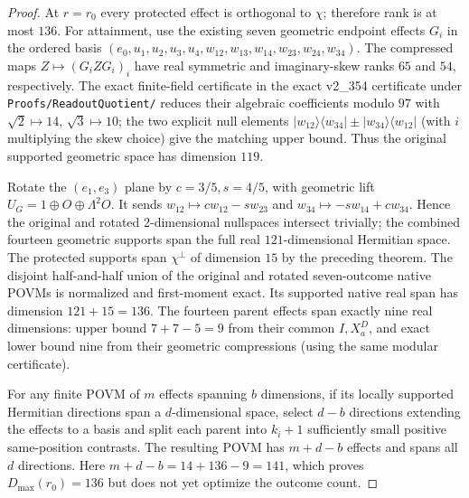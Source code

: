 \documentclass[12pt,a4paper]{article}
\begin{document}
\begin{proof}
At $r=r_0$ every protected effect is orthogonal to $\chi$;
therefore rank is at most $136$.
For attainment, use the existing seven geometric endpoint effects
$G_i$ in the ordered basis
$(e_0,u_1,u_2,u_3,u_4,w_{12},w_{13},w_{14},w_{23},w_{24},w_{34})$.
The compressed maps $Z\mapsto(G_iZG_i)_i$ have real symmetric and
imaginary-skew ranks $65$ and $54$, respectively. The exact
finite-field certificate in
the exact v2\_354 certificate under \texttt{Proofs/ReadoutQuotient/}
reduces their algebraic coefficients modulo $97$ with
$\sqrt2\mapsto14$, $\sqrt3\mapsto10$; the two explicit null elements
$|w_{12}\rangle\langle w_{34}|\pm|w_{34}\rangle\langle w_{12}|$
(with $i$ multiplying the skew choice) give the matching upper bound.
Thus the original supported geometric space has dimension $119$.

Rotate the $(e_1,e_3)$ plane by $c=3/5,s=4/5$, with geometric lift
$U_G=1\oplus O\oplus\Lambda^2O$. It sends
$w_{12}\mapsto cw_{12}-sw_{23}$ and
$w_{34}\mapsto-sw_{14}+cw_{34}$. Hence the original and rotated
2-dimensional nullspaces intersect trivially; the combined fourteen
geometric supports span the full real $121$-dimensional Hermitian space.
The protected supports span $\chi^\perp$ of dimension $15$ by the
preceding theorem. The disjoint half-and-half union of the original
and rotated seven-outcome native POVMs is normalized and first-moment
exact. Its supported native real span has dimension $121+15=136$.
The fourteen parent effects span exactly nine real dimensions:
upper bound $7+7-5=9$ from their common $I,X_a^D$,
and exact lower bound nine from their geometric compressions
(using the same modular certificate).

For any finite POVM of $m$ effects spanning $b$ dimensions, if its
locally supported Hermitian directions span a $d$-dimensional space,
select $d-b$ directions extending the effects to a basis and split
each parent into $k_i+1$ sufficiently small positive same-position
contrasts. The resulting POVM has $m+d-b$ effects and spans all $d$
directions. Here $m+d-b=14+136-9=141$, which proves $D_{\max}(r_0)=136$
but does not yet optimize the outcome count.


\end{proof}
\end{document}
